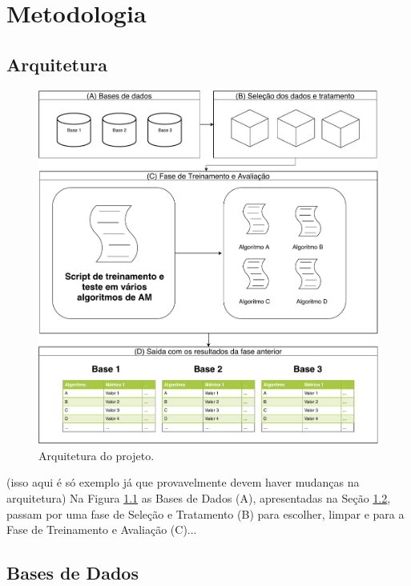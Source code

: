 \chapter{Metodologia}

\section{Arquitetura}

\begin{figure}[htbp]
    \centering
    \includegraphics[width=1\textwidth]{desenvolvimento/Arquitetura.pdf}
    \caption{\label{fig:arquitetura}Arquitetura do projeto.}
\end{figure}

(isso aqui é só exemplo já que provavelmente devem haver mudanças na arquitetura)
Na Figura \ref{fig:arquitetura} as Bases de Dados (A), apresentadas na Seção \ref{basesdedados}, passam por uma fase de Seleção e Tratamento (B) para escolher, limpar e para a Fase de Treinamento e Avaliação (C)...

\section{Bases de Dados} \label{basesdedados}

